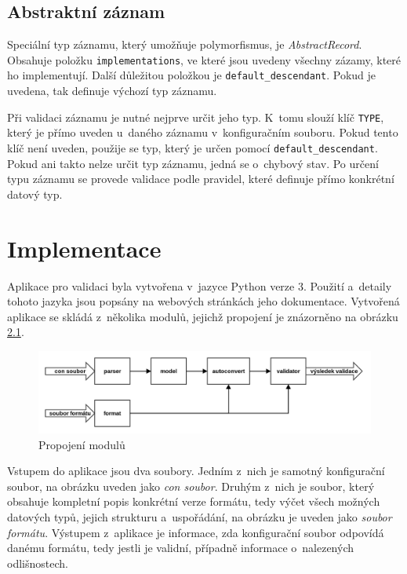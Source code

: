 \documentclass[FM,MP]{tulthesis}
\begin{document}
	\section{Abstraktní záznam}
		Speciální typ záznamu, který umožňuje polymorfismus, je \textit{AbstractRecord}. Obsahuje položku \texttt{implementations}, ve které jsou uvedeny všechny zázamy, které ho implementují. Další důležitou položkou je \texttt{default\_descendant}. Pokud je uvedena, tak definuje výchozí typ záznamu.

		Při validaci záznamu je nutné nejprve určit jeho typ. K~tomu slouží klíč \texttt{TYPE}, který je přímo uveden u~daného záznamu v~konfiguračním souboru. Pokud tento klíč není uveden, použije se typ, který je určen pomocí \texttt{default\_descendant}. Pokud ani takto nelze určit typ záznamu, jedná se o~chybový stav. Po určení typu záznamu se provede validace podle pravidel, které definuje přímo konkrétní datový typ. 

\chapter{Implementace}
	\label{implementace}
	Aplikace pro validaci byla vytvořena v~jazyce Python verze 3. Použití a~detaily tohoto jazyka jsou popsány na webových stránkách jeho dokumentace\cite{bib:python}. Vytvořená aplikace se skládá z~několika modulů, jejichž propojení je znázorněno na obrázku \ref{img:propojeni-modulu}.

	\begin{figure}[h]
		\centering
		\includegraphics[width=\linewidth]{../img/con_modules.png}
		\caption{Propojení modulů}
		\label{img:propojeni-modulu}
	\end{figure}

	Vstupem do aplikace jsou dva soubory. Jedním z~nich je samotný konfigurační soubor, na obrázku uveden jako \textit{con soubor}. Druhým z~nich je soubor, který obsahuje kompletní popis konkrétní verze formátu, tedy výčet všech možných datových typů, jejich strukturu a~uspořádání, na obrázku je uveden jako \textit{soubor formátu}. Výstupem z~aplikace je informace, zda konfigurační soubor odpovídá danému formátu, tedy jestli je validní, případně informace o~nalezených odlišnostech.
\end{document}
